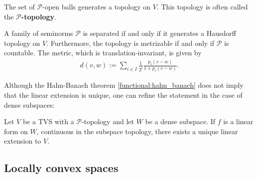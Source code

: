    \begin{property}
        The set of $\mathscr{P}$-open balls generates a topology on $V$. This topology is often called the \textbf{$\mathscr{P}$-topology}.
    \end{property}

    \begin{property}\label{functional:separated_metric}
        A family of seminorms $\mathcal{P}$ is separated if and only if it generates a Hausdorff topology on $V$. Furthermore, the topology is metrizable if and only if $\mathcal{P}$ is countable. The metric, which is translation-invariant, is given by
        \begin{gather}
            d(v,w) := \sum_{i\in I}\frac{1}{2^i}\frac{p_i(v-w)}{1 + p_i(v-w)}.
        \end{gather}
    \end{property}

    Although the Hahn-Banach theorem \ref{functional:hahn_banach} does not imply that the linear extension is unique, one can refine the statement in the case of dense subspaces:
    \begin{result}
        Let $V$ be a TVS with a $\mathscr{P}$-topology and let $W$ be a dense subspace. If $f$ is a linear form on $W$, continuous in the subspace topology, there exists a unique linear extension to $V$.
    \end{result}

\subsection{Locally convex spaces}

